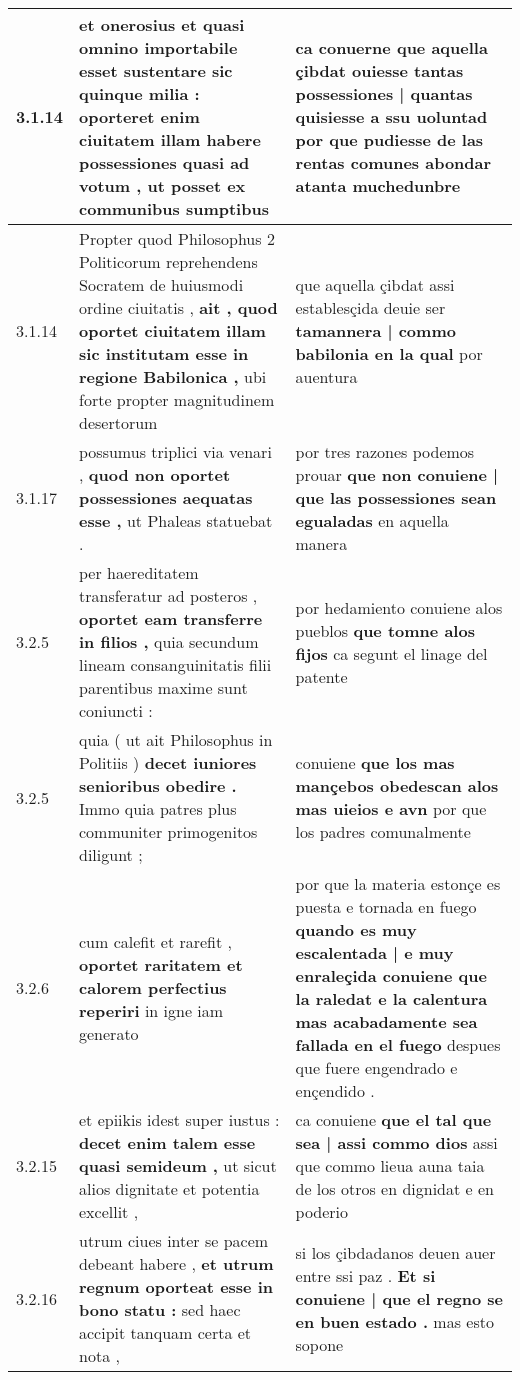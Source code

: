 \begin{tabular}{|p{1cm}|p{6.5cm}|p{6.5cm}|}
3.1.14 & et onerosius et quasi omnino importabile esset sustentare sic quinque milia : \textbf{ oporteret enim ciuitatem illam habere possessiones quasi ad votum , } ut posset ex communibus sumptibus & ca conuerne \textbf{ que aquella çibdat ouiesse tantas possessiones | quantas quisiesse a ssu uoluntad } por que pudiesse de las rentas comunes abondar atanta muchedunbre \\\hline
3.1.14 & Propter quod Philosophus 2 Politicorum reprehendens Socratem de huiusmodi ordine ciuitatis , \textbf{ ait , quod oportet ciuitatem illam sic institutam esse in regione Babilonica , } ubi forte propter magnitudinem desertorum & que aquella çibdat assi establesçida deuie ser \textbf{ tamannera | commo babilonia en la qual } por auentura \\\hline
3.1.17 & possumus triplici via venari , \textbf{ quod non oportet possessiones aequatas esse , } ut Phaleas statuebat . & por tres razones podemos prouar \textbf{ que non conuiene | que las possessiones sean egualadas } en aquella manera \\\hline
3.2.5 & per haereditatem transferatur ad posteros , \textbf{ oportet eam transferre in filios , } quia secundum lineam consanguinitatis filii parentibus maxime sunt coniuncti : & por hedamiento conuiene alos pueblos \textbf{ que tomne alos fijos } ca segunt el linage del patente \\\hline
3.2.5 & quia ( ut ait Philosophus in Politiis ) \textbf{ decet iuniores senioribus obedire . } Immo quia patres plus communiter primogenitos diligunt ; & conuiene \textbf{ que los mas mançebos obedescan alos mas uieios e avn } por que los padres comunalmente \\\hline
3.2.6 & cum calefit et rarefit , \textbf{ oportet raritatem et calorem perfectius reperiri } in igne iam generato & por que la materia estonçe es puesta e tornada en fuego \textbf{ quando es muy escalentada | e muy enraleçida conuiene que la raledat e la calentura mas acabadamente sea fallada en el fuego } despues que fuere engendrado e ençendido . \\\hline
3.2.15 & et epiikis idest super iustus : \textbf{ decet enim talem esse quasi semideum , } ut sicut alios dignitate et potentia excellit , & ca conuiene \textbf{ que el tal que sea | assi commo dios } assi que commo lieua auna taia de los otros en dignidat e en poderio \\\hline
3.2.16 & utrum ciues inter se pacem debeant habere , \textbf{ et utrum regnum oporteat esse in bono statu : } sed haec accipit tanquam certa et nota , & si los çibdadanos deuen auer entre ssi paz . \textbf{ Et si conuiene | que el regno se en buen estado . } mas esto sopone \\\hline

\end{tabular}
